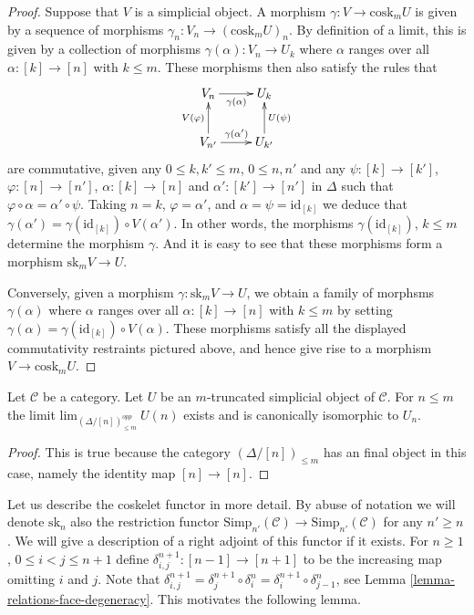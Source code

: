 \begin{proof}
Suppose that $V$ is a simplicial object.
A morphism $\gamma : V \to \text{cosk}_mU$ is given by a sequence
of morphisms $\gamma_n : V_n \to (\text{cosk}_mU)_n$.
By definition of a limit, this is given by a
collection of morphisms $\gamma(\alpha) : V_n \to U_k$
where $\alpha$ ranges over all $\alpha : [k] \to [n]$
with $k \leq m$. These morphisms then also satisfy
the rules that
$$
\xymatrix{
V_n \ar[r]_{\gamma(\alpha)} &  U_k \\
V_{n'} \ar[r]^{\gamma(\alpha')} \ar[u]^{V(\varphi)} & U_{k'} \ar[u]_{U(\psi)}
}
$$
are commutative, given any $0 \leq k, k' \leq m$, $0 \leq n, n'$
and any $\psi : [k] \to [k']$, $\varphi : [n] \to [n']$,
$\alpha : [k] \to [n]$ and $\alpha' : [k'] \to [n']$ in $\Delta$
such that $\varphi \circ \alpha = \alpha' \circ \psi$.
Taking $n = k$, $\varphi = \alpha'$, and $\alpha = \psi = \text{id}_{[k]}$
we deduce that $\gamma(\alpha') = \gamma(\text{id}_{[k]}) \circ V(\alpha')$.
In other words, the morphisms $\gamma(\text{id}_{[k]})$, $k \leq m$
determine the morphism $\gamma$. And it is easy to see that these
morphisms form a morphism $\text{sk}_m V \to U$.

\medskip\noindent
Conversely, given a morphism $\gamma : \text{sk}_m V \to U$, 
we obtain a family of morphsms $\gamma(\alpha)$
where $\alpha$ ranges over all $\alpha : [k] \to [n]$
with $k \leq m$ by setting $\gamma(\alpha) = 
\gamma(\text{id}_{[k]}) \circ V(\alpha)$. These morphisms
satisfy all the displayed commutativity restraints pictured
above, and hence give rise to a morphism $V \to \text{cosk}_m U$.
\end{proof}

\begin{lemma}
\label{lemma-trivial-cosk}
Let $\mathcal{C}$ be a category.
Let $U$ be an $m$-truncated simplicial object of $\mathcal{C}$.
For $n \leq m$ the limit $\text{lim}_{(\Delta/[n])_{\leq m}^{opp}}\ U(n)$
exists and is canonically isomorphic to $U_n$.
\end{lemma}

\begin{proof}
This is true because the category $(\Delta/[n])_{\leq m}$
has an final object in this case, namely the identity
map $[n] \to [n]$.
\end{proof}

\noindent
Let us describe the coskelet functor in more detail.
By abuse of notation we will denote $\text{sk}_n$
also the restriction functor
$\text{Simp}_{n'}(\mathcal{C}) \to \text{Simp}_{n'}(\mathcal{C})$
for any $n' \geq n$. We will give a description of a right adjoint
of this functor if it exists.
For $n \geq 1$, $0 \leq i < j \leq n + 1$
define $\delta^{n + 1}_{i,j} : [n - 1] \to [n + 1]$
to be the increasing map omitting $i$ and $j$.
Note that
$\delta^{n + 1}_{i,j} =
\delta^{n + 1}_j \circ \delta^n_i =
\delta^{n + 1}_i \circ \delta^n_{j - 1}$, see
Lemma \ref{lemma-relations-face-degeneracy}. This motivates
the following lemma.

